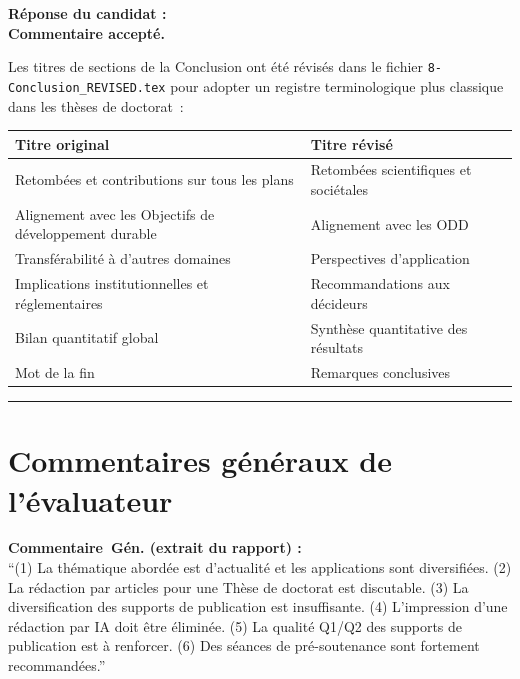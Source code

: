 \documentclass[12pt,a4paper]{article}
\newcommand{\Commentaire}[2]{%
  \begin{reviewerbox}
    \textbf{Commentaire~#1 (extrait du rapport) :}\\#2
  \end{reviewerbox}%
}
\newcommand{\Reponse}[1]{%
  \begin{responsebox}
    \textbf{Réponse du candidat :}\\#1
  \end{responsebox}%
}
\begin{document}
\Reponse{
\textbf{Commentaire accepté.}

Les titres de sections de la Conclusion ont été révisés dans le fichier \texttt{8-Conclusion\_REVISED.tex} pour adopter un registre terminologique plus classique dans les thèses de doctorat~:

\begin{center}
\small
\begin{tabular}{p{7cm} p{7cm}}
\toprule
\textbf{Titre original} & \textbf{Titre révisé} \\
\midrule
Retombées et contributions sur tous les plans & Retombées scientifiques et sociétales \\
Alignement avec les Objectifs de développement durable & Alignement avec les ODD \\
Transférabilité à d'autres domaines & Perspectives d'application \\
Implications institutionnelles et réglementaires & Recommandations aux décideurs \\
Bilan quantitatif global & Synthèse quantitative des résultats \\
Mot de la fin & Remarques conclusives \\
\bottomrule
\end{tabular}
\end{center}
}

\bigskip
\hrule
\bigskip

\section*{Commentaires généraux de l'évaluateur}

\Commentaire{Gén.}{
  ``(1) La thématique abordée est d'actualité et les applications sont diversifiées.
  (2) La rédaction par articles pour une Thèse de doctorat est discutable.
  (3) La diversification des supports de publication est insuffisante.
  (4) L'impression d'une rédaction par IA doit être éliminée.
  (5) La qualité Q1/Q2 des supports de publication est à renforcer.
  (6) Des séances de pré-soutenance sont fortement recommandées.''
}
\end{document}
